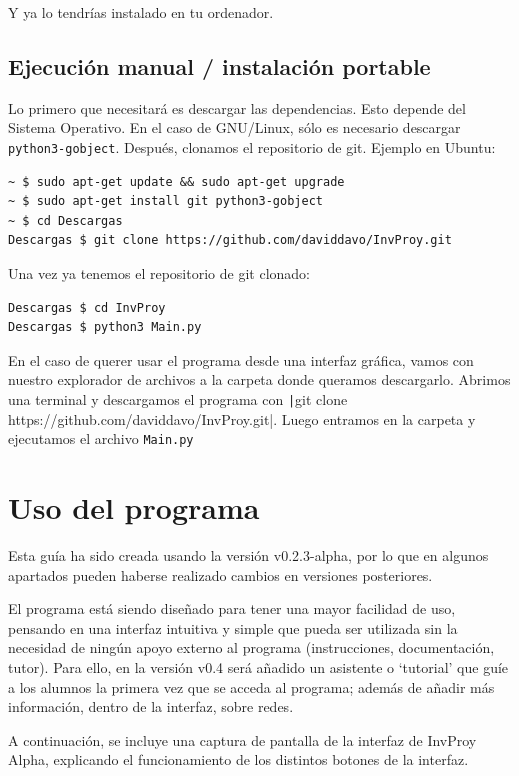 \documentclass[a4paper, 11pt]{report} %
\begin{document}
Y ya lo tendrías instalado en tu ordenador.

\subsection{Ejecución manual / instalación portable}
Lo primero que necesitará es descargar las dependencias. Esto depende del Sistema Operativo. En el caso de GNU/Linux, sólo es necesario descargar \texttt{python3-gobject}. Después, clonamos el repositorio de git. Ejemplo en Ubuntu:
\begin{verbatim}
~ $ sudo apt-get update && sudo apt-get upgrade
~ $ sudo apt-get install git python3-gobject
~ $ cd Descargas
Descargas $ git clone https://github.com/daviddavo/InvProy.git
\end{verbatim}

\noindent Una vez ya tenemos el repositorio de git clonado:
\begin{verbatim}
Descargas $ cd InvProy
Descargas $ python3 Main.py
\end{verbatim}

En el caso de querer usar el programa desde una interfaz gráfica, vamos con nuestro explorador de archivos a la carpeta donde queramos descargarlo. Abrimos una terminal y descargamos el programa con \texttt|git clone https://github.com/daviddavo/InvProy.git|. Luego entramos en la carpeta y ejecutamos el archivo \texttt{Main.py}
\section{Uso del programa}
Esta guía ha sido creada usando la versión v0.2.3-alpha, por lo que en algunos apartados pueden haberse realizado cambios en versiones posteriores.

El programa está siendo diseñado para tener una mayor facilidad de uso, pensando en una interfaz intuitiva y simple que pueda ser utilizada sin la necesidad de ningún apoyo externo al programa (instrucciones, documentación, tutor). Para ello, en la versión v0.4 será añadido un asistente o `tutorial' que guíe a los alumnos la primera vez que se acceda al programa; además de añadir más información, dentro de la interfaz, sobre redes.

A continuación, se incluye una captura de pantalla de la interfaz de InvProy Alpha, explicando el funcionamiento de los distintos botones de la interfaz.
\end{document}
